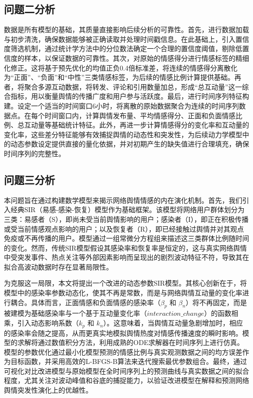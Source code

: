 \documentclass[withoutpreface,bwprint]{cumcmthesis}
\begin{document}
\subsection{问题二分析}	
数据是所有模型的基础，其质量直接影响后续分析的可靠性。首先，进行数据加载与初步清洗，确保数据能够被正确读取并处理时间戳信息。在此基础上，引入置信度筛选机制，通过统计学方法中的分位数法确定一个合理的置信度阈值，剔除低置信度的样本，以保证数据的可靠性。其次，对原始的情感得分进行情感标签的精细化修正。这将基于预先优化的均值正负0.4倍标准差，将连续的情感得分离散化为“正面”、“负面”和“中性”三类情感标签，为后续的情感比例计算提供基础。再者，将聚合多源互动数据，将转发、评论和引用数量加总，形成“总互动量”这一综合指标，用以衡量舆情的传播广度和用户参与活跃度。最后，进行时间序列特征构建。设定一个适当的时间窗口6小时，将离散的原始数据聚合为连续的时间序列数据点。在每个时间窗口内，计算舆情发布量、平均情感得分、正面和负面情感比例、总互动量等基础统计特征。此外，再进一步计算情感得分的变化率和互动量的变化率，这些差分特征能够有效捕捉舆情的动态性和突发性，为后续动力学模型中的动态参数设定提供直接的量化依据，并对初期产生的缺失值进行合理填充，确保时间序列的完整性。

\subsection{问题三分析}
本问题旨在通过构建数学模型来揭示网络舆情情感的内在演化机制。首先，我们引入经典SIR（易感-感染-恢复）模型作为基础框架。该模型将网络用户群体划分为三类：易感者（S），即尚未受当前舆情影响的用户；感染者（I），即正在积极传播或受当前情感观点影响的用户；以及恢复者（R），即已经接触过舆情并对其观点免疫或不再传播的用户。模型通过一组常微分方程组来描述这三类群体比例随时间的变化。然而，传统SIR模型假设其感染率和恢复率是恒定的，这与真实网络舆情中受突发事件、热点关注等外部因素影响而呈现出的剧烈波动特征不符，导致其在拟合高波动数据时存在显著局限性。

为克服这一局限，本文将提出一个改进的动态参数SIR模型。其核心创新在于，将模型中的感染率参数动态化，使其不再是常数，而是与网络舆情互动量的变化率进行耦合。具体而言，正面情感和负面情感的感染率（$\beta_p$ 和 $\beta_n$）将不再固定，而是被建模为基础感染率与一个基于互动量变化率（$interaction\_change$）的函数相乘，引入动态影响系数（$k_p$ 和 $k_n$）。这意味着，当舆情互动量急剧增加时，相应的感染率会随之提高，从而更真实地模拟舆情热度对情感传播速度的瞬时影响。模型的求解将通过数值积分方法，利用成熟的ODE求解器在时间序列上进行仿真。模型的参数优化通过最小化模型预测的情感比例与真实观测数据之间的均方误差作为目标函数，并采用高效的L-BFGS-B算法来迭代搜索最优参数组合。最终，通过可视化对比改进模型与原始模型在全时间序列上的预测曲线与真实数据之间的拟合程度，尤其关注对波动峰值和谷底的捕捉能力，以验证改进模型在解释和预测网络舆情突发性演化上的优越性。
\end{document}
